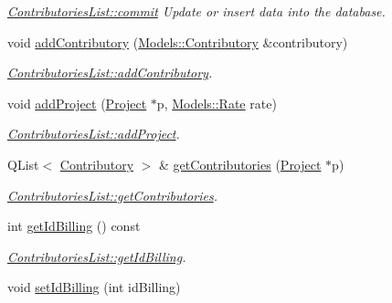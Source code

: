 \begin{DoxyCompactItemize}
\begin{DoxyCompactList}\small\item\em \hyperlink{classModels_1_1ContributoriesList_ad341e0527f4c9057281400f6cf54e54f}{Contributories\-List\-::commit} Update or insert data into the database. \end{DoxyCompactList}\item 
void \hyperlink{classModels_1_1ContributoriesList_a62b01d5292326da5902589ddb9b71234}{add\-Contributory} (\hyperlink{classModels_1_1Contributory}{Models\-::\-Contributory} \&contributory)
\begin{DoxyCompactList}\small\item\em \hyperlink{classModels_1_1ContributoriesList_a62b01d5292326da5902589ddb9b71234}{Contributories\-List\-::add\-Contributory}. \end{DoxyCompactList}\item 
void \hyperlink{classModels_1_1ContributoriesList_a4c99c890fc7d7616678d6e5f7ee558f5}{add\-Project} (\hyperlink{classModels_1_1Project}{Project} $\ast$p, \hyperlink{classModels_1_1Rate}{Models\-::\-Rate} rate)
\begin{DoxyCompactList}\small\item\em \hyperlink{classModels_1_1ContributoriesList_a4c99c890fc7d7616678d6e5f7ee558f5}{Contributories\-List\-::add\-Project}. \end{DoxyCompactList}\item 
Q\-List$<$ \hyperlink{classModels_1_1Contributory}{Contributory} $>$ \& \hyperlink{classModels_1_1ContributoriesList_a2549547fd3866d879ebbfd1f38145fc5}{get\-Contributories} (\hyperlink{classModels_1_1Project}{Project} $\ast$p)
\begin{DoxyCompactList}\small\item\em \hyperlink{classModels_1_1ContributoriesList_a2549547fd3866d879ebbfd1f38145fc5}{Contributories\-List\-::get\-Contributories}. \end{DoxyCompactList}\item 
int \hyperlink{classModels_1_1ContributoriesList_a3fbbce49ffcdbfa0693f4d21dd0d8c14}{get\-Id\-Billing} () const 
\begin{DoxyCompactList}\small\item\em \hyperlink{classModels_1_1ContributoriesList_a3fbbce49ffcdbfa0693f4d21dd0d8c14}{Contributories\-List\-::get\-Id\-Billing}. \end{DoxyCompactList}\item 
void \hyperlink{classModels_1_1ContributoriesList_ad93d74f1b3e0a4ad83bad859812b3547}{set\-Id\-Billing} (int id\-Billing)

\end{DoxyCompactItemize}
